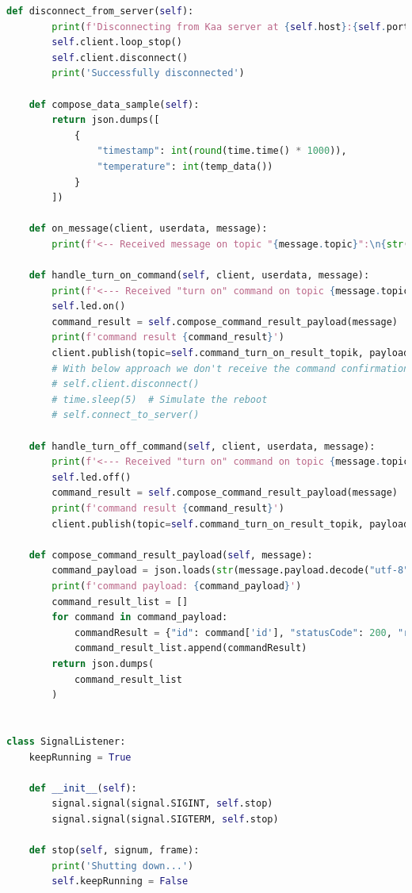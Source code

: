 \begin{lstlisting}[language=Python]
    def disconnect_from_server(self):
        print(f'Disconnecting from Kaa server at {self.host}:{self.port}...')
        self.client.loop_stop()
        self.client.disconnect()
        print('Successfully disconnected')

    def compose_data_sample(self):
        return json.dumps([
            {
                "timestamp": int(round(time.time() * 1000)),
                "temperature": int(temp_data())
            }
        ])

    def on_message(client, userdata, message):
        print(f'<-- Received message on topic "{message.topic}":\n{str(message.payload.decode("utf-8"))}')

    def handle_turn_on_command(self, client, userdata, message):
        print(f'<--- Received "turn on" command on topic {message.topic} \nTurning on...')
        self.led.on()
        command_result = self.compose_command_result_payload(message)
        print(f'command result {command_result}')
        client.publish(topic=self.command_turn_on_result_topik, payload=command_result)
        # With below approach we don't receive the command confirmation on the server side.
        # self.client.disconnect()
        # time.sleep(5)  # Simulate the reboot
        # self.connect_to_server()

    def handle_turn_off_command(self, client, userdata, message):
        print(f'<--- Received "turn on" command on topic {message.topic} \nTurning off...')
        self.led.off()
        command_result = self.compose_command_result_payload(message)
        print(f'command result {command_result}')
        client.publish(topic=self.command_turn_on_result_topik, payload=command_result)

    def compose_command_result_payload(self, message):
        command_payload = json.loads(str(message.payload.decode("utf-8")))
        print(f'command payload: {command_payload}')
        command_result_list = []
        for command in command_payload:
            commandResult = {"id": command['id'], "statusCode": 200, "reasonPhrase": "OK", "payload": "Success"}
            command_result_list.append(commandResult)
        return json.dumps(
            command_result_list
        )


class SignalListener:
    keepRunning = True

    def __init__(self):
        signal.signal(signal.SIGINT, self.stop)
        signal.signal(signal.SIGTERM, self.stop)

    def stop(self, signum, frame):
        print('Shutting down...')
        self.keepRunning = False

\end{lstlisting}

